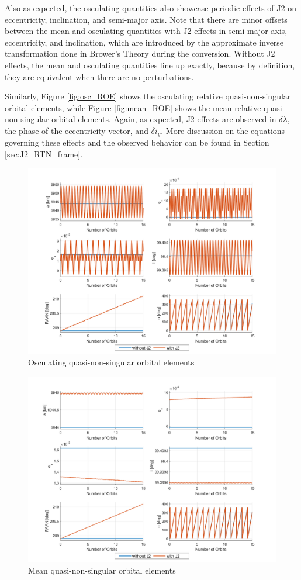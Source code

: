 Also as expected, the osculating quantities also showcase periodic effects of J2 on eccentricity, inclination, and semi-major axis. Note that there are minor offsets between the mean and osculating quantities with J2 effects in semi-major axis, eccentricity, and inclination, which are introduced by the approximate inverse transformation done in Brower's Theory during the conversion. Without J2 effects, the mean and osculating quantities line up exactly, because by definition, they are equivalent when there are no perturbations. 

Similarly, Figure \ref{fig:osc_ROE} shows the osculating relative quasi-non-singular orbital elements, while Figure \ref{fig:mean_ROE} shows the mean relative quasi-non-singular orbital elements. Again, as expected, J2 effects are observed in $\delta \lambda$, the phase of the eccentricity vector, and $\delta i_y$. More discussion on the equations governing these effects and the observed behavior can be found in Section \ref{sec:J2_RTN_frame}.

\begin{figure}[H]
    \centering
    \includegraphics[width=0.75\linewidth]{sim/figures/PS4/OE_abs_osc_SV2.png}
    \caption{Osculating quasi-non-singular orbital elements}
    \label{fig:osc_OE}
\end{figure}

\begin{figure}[H]
    \centering
    \includegraphics[width=0.75\linewidth]{sim/figures/PS4/OE_abs_mean_SV2.png}
    \caption{Mean quasi-non-singular orbital elements}
    \label{fig:mean_OE}
\end{figure}

